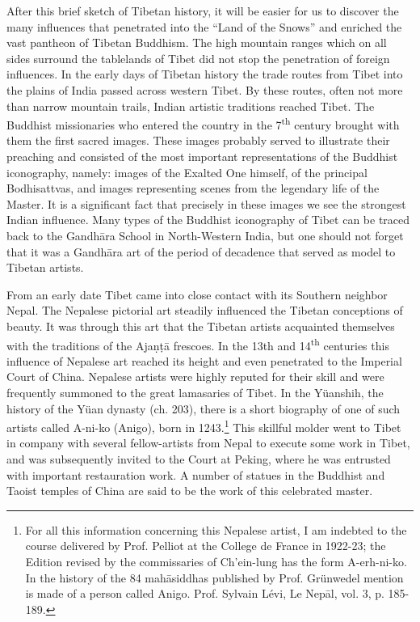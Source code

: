 \documentclass[a4paper, 12pt, oneside]{article}
\begin{document}
After this brief sketch of Tibetan history, it will be easier for us to discover the many influences that penetrated into the ``Land of the Snows'' and enriched the vast pantheon of Tibetan Buddhism. The high mountain ranges which on all sides surround the tablelands of Tibet did not stop the penetration of foreign influences. In the early days of Tibetan history the trade routes from Tibet into the plains of India passed across western Tibet. By these routes, often not more than narrow mountain trails, Indian artistic traditions reached Tibet. The Buddhist missionaries who entered the country in the 7\textsuperscript{th} century brought with them the first sacred images. These images probably served to illustrate their preaching and consisted of the most important representations of the Buddhist iconography, namely: images of the Exalted One himself, of the principal Bodhisattvas, and images representing scenes from the legendary life of the Master. It is a significant fact that precisely in these images we see the strongest Indian influence. Many types of the Buddhist iconography of Tibet can be traced back to the Gandh\={a}ra School in North-Western India, but one should not forget that it was a Gandh\={a}ra art of the period of decadence that served as model to Tibetan artists.

From an early date Tibet came into close contact with its Southern neighbor Nepal. The Nepalese pictorial art steadily influenced the Tibetan conceptions of beauty. It was through this art that the Tibetan artists acquainted themselves with the traditions of the Aja\d{n}\d{t}\={a} frescoes. In the 13th and 14\textsuperscript{th} centuries this influence of Nepalese art reached its height and even penetrated to the Imperial Court of China. Nepalese artists were highly reputed for their skill and were frequently summoned to the great lamasaries of Tibet. In the Yüanshih, the history of the Yüan dynasty (ch. 203), there is a short biography of one of such artists called A-ni-ko (Anigo), born in 1243.\footnote{For all this information concerning this Nepalese artist, I am indebted to the course delivered by Prof. Pelliot at the College de France in 1922-23; the Edition revised by the commissaries of Ch'ein-lung has the form A-erh-ni-ko. In the history of the 84 mah\={a}siddhas published by Prof. Grünwedel mention is made of a person called Anigo. Prof. Sylvain Lévi, Le Nep\={a}l, vol. 3, p. 185-189.} This skillful molder went to Tibet in company with several fellow-artists from Nepal to execute some work in Tibet, and was subsequently invited to the Court at Peking, where he was entrusted with important restauration work. A number of statues in the Buddhist and Taoist temples of China are said to be the work of this celebrated master.
\end{document}
